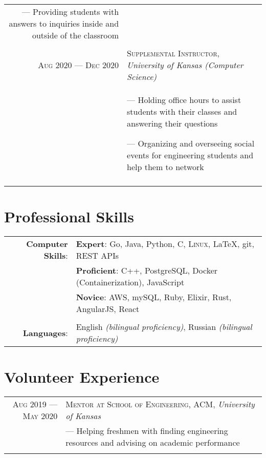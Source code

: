 \documentclass[a4paper, 10pt]{article}
\begin{document}
\begin{tabular}{r|p{12cm}}
{		--- Providing students with answers to inquiries inside and outside of the classroom
	}                                                                                                                            \\\multicolumn{2}{c}{}\\


	\textsc{Aug 2020 --- Dec 2020} & \textsc{Supplemental Instructor}, \emph{University of Kansas (Computer Science)}            \\&\footnotesize{
		--- Holding office hours to assist students with their classes and answering their questions

		--- Organizing and overseeing social events for engineering students and help them to network
	}                                                                                                                            \\\multicolumn{2}{c}{}\\
\end{tabular}

\section{Professional Skills}
\begin{tabular}{rl}
	\textbf{Computer Skills}: &
	\textbf{Expert}: Go, Java, Python, C, \textsc{Linux}, \LaTeX, git, REST APIs                               \\&
	\textbf{Proficient}: C++, PostgreSQL, Docker (Containerization), JavaScript                                \\&
	\textbf{Novice}: AWS, mySQL, Ruby, Elixir, Rust, AngularJS, React                                          \\\\

	\textbf{Languages}:       & English \emph{(bilingual proficiency)}, Russian \emph{(bilingual proficiency)} \\
\end{tabular}

\section{Volunteer Experience}
\begin{tabular}{r|p{12cm}}

	\textsc{Aug 2019 --- May 2020} & \textsc{Mentor at School of Engineering, ACM}, \emph{University of Kansas} \\&\footnotesize{
		--- Helping freshmen with finding engineering resources and advising on academic performance
	}                                                                                                           \\\multicolumn{2}{c}{}\\
\end{tabular}
\end{document}

